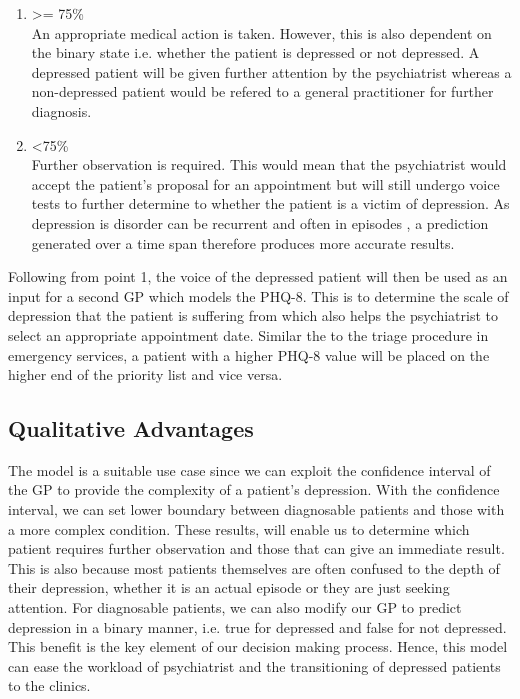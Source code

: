 \documentclass{article}
\begin{document}
	\begin{enumerate}
		\item {\textgreater= 75\%} \\
		An appropriate medical action is taken. 
		However, this is also dependent on the binary state i.e. whether the patient is depressed or not depressed. 
		A depressed patient will be given further attention by the psychiatrist whereas a non-depressed patient would be refered to a general practitioner for further diagnosis.
		\item {\textless 75\%} \\
		Further observation is required. This would mean that the psychiatrist would accept the patient's proposal for an appointment but will still undergo voice tests to further determine to whether the patient is a victim of depression. 
		As depression is disorder can be recurrent and often in episodes \cite{bp6152013}, a prediction generated over a time span therefore produces more accurate results.\\
	\end{enumerate}
	
	Following from point 1, the voice of the depressed patient will then be used as an input for a second GP which models the PHQ-8. 
	This is to determine the scale of depression that the patient is suffering from which also helps the psychiatrist to select an appropriate appointment date. 		
	Similar the to the triage procedure in emergency services, a patient with a higher PHQ-8 value will be placed on the higher end of the priority list and vice versa.

	\subsection{Qualitative Advantages}
	The model is a suitable use case since we can exploit the confidence interval of the GP to provide the complexity of a patient's depression.
	With the confidence interval, we can set lower boundary between diagnosable patients and those with a more complex condition.
	These results, will enable us to determine which patient requires further observation and those that can give an immediate result.
	This is also because most patients themselves are often confused to the depth of their depression, whether it is an actual episode or they are just seeking attention.
	For diagnosable patients, we can also modify our GP to predict depression in a binary manner, i.e. true for depressed and false for not depressed.
	This benefit is the key element of our decision making process.
	Hence, this model can ease the workload of psychiatrist and the transitioning of depressed patients to the clinics. \\
\end{document}
